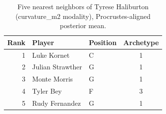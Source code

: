 \begin{table}[htbp]
  \centering\small
  \begin{tabular}{rllc}
    \toprule
    Rank & Player & Position & Archetype \\
    \midrule
    1 & Luke Kornet & C & 1 \\
    2 & Julian Strawther & G & 1 \\
    3 & Monte Morris & G & 1 \\
    4 & Tyler Bey & F & 3 \\
    5 & Rudy Fernandez & G & 1 \\
    \bottomrule
  \end{tabular}
  \caption{Five nearest neighbors of Tyrese Haliburton (curvature_m2 modality), Procrustes-aligned posterior mean.}
  \label{tab:Tyrese_Haliburton_neighbors_curvature_m2}
\end{table}

